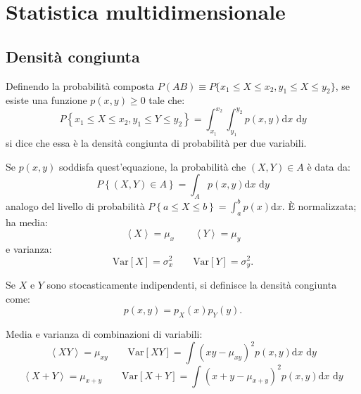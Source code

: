 \chapter{Statistica multidimensionale} %
\section{Densità congiunta} %
\label{sec:densità-congiunta}
Definendo la probabilità composta $P(AB)\equiv P \{x_1 \le X \le x_2 , y_1 \le X \le y_2\}$, se esiste una funzione $p(x,y)\ge 0$ tale che:
\[
P\left\{ x_{ 1 }\le X\le x_{ 2 },y_{ 1 }\le Y\le y_{ 2 } \right\} =\int _{ x_{ 1 } }^{ x_{ 2 } } \int _{ y_{ 1 } }^{ y_{ 2 } }{ p\left( x,y \right) \textrm{d}x \textrm{ d}y } 
\]
si dice che essa è la densità congiunta di probabilità per due variabili.

Se $p(x,y)$ soddisfa quest'equazione, la probabilità che $(X,Y)\in A$ è data da:
\begin{equation}
P\left\{ \left( X,Y \right) \in A \right\} =\int _{ A }{ p\left( x,y \right) \textrm{d}x \textrm{ d}y } 
\end{equation}
analogo del livello di probabilità $P\left\{ a\le X\le b \right\} =\int _{ a }^{ b }{ p\left( x \right) \textrm{d}x } $.
\`E normalizzata; ha media: 
\begin{equation}
\left< X \right> =\mu _{ x }\qquad \left< Y \right> =\mu _{ y }
\end{equation}
e varianza:
\begin{equation}
\textrm{Var}\left[ X \right] =\sigma ^{ 2 }_{ x }\qquad \textrm{Var}\left[ Y \right] =\sigma ^{ 2 }_{ y }.
\end{equation}

Se $X$ e $Y$ sono stocasticamente indipendenti, si definisce la densità congiunta come:
\begin{equation}
\label{eq:densità-congiunta-indip}
p\left( x,y \right) =p_X\left( x \right) p_Y\left( y \right) .
\end{equation}

Media e varianza di combinazioni di variabili:
\begin{equation}
\left< XY \right> =\mu _{ xy }\qquad \textrm{Var}\left[ XY \right] =\int { (xy-\mu _{ xy })^{ 2 }p(x,y) \textrm{d}x \textrm{ d}y }
\end{equation}
\begin{equation}
\left< X+Y \right> =\mu _{ x+y } \qquad \textrm{Var}\left[ X+Y \right] =\int { (x+y-\mu _{ x+y })^{ 2 }p(x,y) \textrm{d}x \textrm{ d}y } 
\end{equation}

